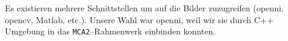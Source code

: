 


Es existieren mehrere Schnittstellen um auf die Bilder zuzugreifen (\gls{openni}, \gls{opencv}, Matlab, etc.).
 Unsere Wahl war \gls{openni}, weil wir sie durch C++ Umgebung in das
 \lstinline{MCA2}--Rahmenwerk einbinden konnten.

